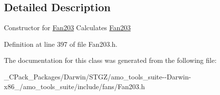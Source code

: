 \subsection{Detailed Description}
Constructor for \hyperlink{class_fan203}{Fan203} Calculates \hyperlink{class_fan203}{Fan203} 

Definition at line 397 of file Fan203.\+h.



The documentation for this class was generated from the following file\+:\begin{DoxyCompactItemize}
\item 
\+\_\+\+C\+Pack\+\_\+\+Packages/\+Darwin/\+S\+T\+G\+Z/amo\+\_\+tools\+\_\+suite-\/-\/\+Darwin-\/x86\+\_/amo\+\_\+tools\+\_\+suite/include/fans/Fan203.\+h\end{DoxyCompactItemize}
